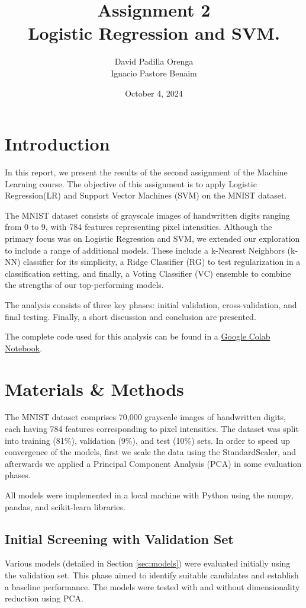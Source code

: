 \documentclass[twocolumn]{article}
\title{Assignment 2 \\ \small Logistic Regression and SVM.}
\author{David Padilla Orenga\\ Ignacio Pastore Benaim}
\date{October 4, 2024}   %
\begin{document}
\maketitle


\section{Introduction}
In this report, we present the results of the second assignment of the Machine Learning course. The objective of 
this assignment is to apply Logistic Regression(LR) and Support Vector Machines (SVM) on the MNIST dataset.

The MNIST dataset consists of grayscale images of handwritten digits ranging from 0 to 9, with 784 features representing pixel intensities.
 Although the primary focus was on Logistic Regression and SVM, we extended our exploration to include a range of additional models. 
These include a k-Nearest Neighbors (k-NN) classifier for its simplicity, a Ridge Classifier (RG) to test regularization in a classification setting, 
and finally, a Voting Classifier (VC) ensemble to combine the strengths of our top-performing models.

The analysis consists of three key phases: initial validation, cross-validation, and final testing. Finally, a short discussion and conclusion are presented.

The complete code used for this analysis can be found in a \href{https://colab.research.google.com/drive/13kod-JLhBAfCC45ZzxLh-nNYDdaXYYJd?usp=sharing}{Google Colab Notebook}.

\section{Materials \& Methods}

The MNIST dataset comprises 70,000 grayscale images of handwritten digits, each having 784 features corresponding to pixel intensities. 
The dataset was split into training (81\%), validation (9\%), and test (10\%) sets. In order to speed up convergence of the models, first we scale the data using the StandardScaler, and afterwards
we applied a Principal Component Analysis (PCA) in some evaluation phases. 

All models were implemented in a local machine with Python using the numpy, pandas, and scikit-learn libraries.

\subsection{Initial Screening with Validation Set}
Various models (detailed in Section \ref{sec:models}) were evaluated initially using the validation set. This phase aimed to identify suitable candidates and establish a baseline performance. 
The models were tested with and without dimensionality reduction using PCA.
\end{document}
